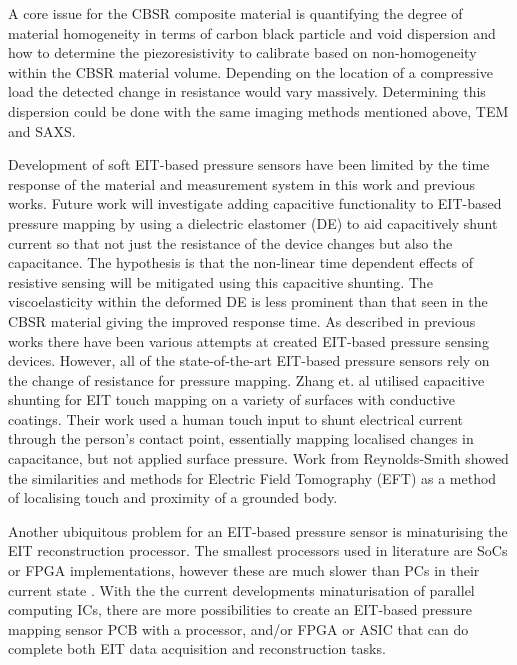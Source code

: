 A core issue for the CBSR composite material is quantifying the degree of material homogeneity in terms of carbon black particle and void dispersion and how to determine the piezoresistivity to calibrate based on non-homogeneity within the CBSR material volume. Depending on the location of a compressive load the detected change in resistance would vary massively. Determining this dispersion could be done with the same imaging methods mentioned above, TEM and SAXS.

Development of soft EIT-based pressure sensors have been limited by the time response of the material and measurement system in this work and previous works. Future work will investigate adding capacitive functionality to EIT-based pressure mapping by using a dielectric elastomer (DE) to aid capacitively shunt current so that not just the resistance of the device changes but also the capacitance. The hypothesis is that the non-linear time dependent effects of resistive sensing will be mitigated using this capacitive shunting. The viscoelasticity within the deformed DE is less prominent than that seen in the CBSR material giving the improved response time. As described in previous works \cite{Ellingham2024} there have been various attempts at created EIT-based pressure sensing devices. However, all of the state-of-the-art EIT-based pressure sensors rely on the change of resistance for pressure mapping. Zhang et. al \cite{Zhang2017} utilised capacitive shunting for EIT touch mapping on a variety of surfaces with conductive coatings. Their work used a human touch input to shunt electrical current through the person's contact point, essentially mapping localised changes in capacitance, but not applied surface pressure. Work from Reynolds-Smith \cite{Reynoldssmith1995,Reynoldssmith1999} showed the similarities and methods for Electric Field Tomography (EFT) as a method of localising touch and proximity of a grounded body. 

Another ubiquitous problem for an EIT-based pressure sensor is minaturising the EIT reconstruction processor. The smallest processors used in literature are SoCs or FPGA implementations, however these are much slower than PCs in their current state \cite{ZamoraArellano2020,Kim2017,Takhti2019,Liu2019}. With the the current developments minaturisation of parallel computing ICs, there are more possibilities to create an EIT-based pressure mapping sensor PCB with a processor, and/or FPGA or ASIC that can do complete both EIT data acquisition and reconstruction tasks.

